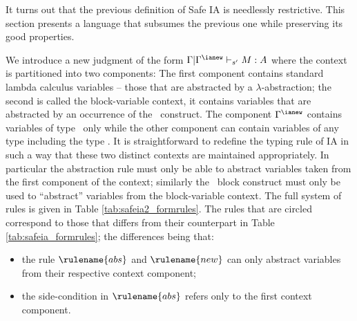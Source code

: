 It turns out that the previous definition of Safe IA is needlessly
restrictive. This section presents a language that subsumes the
previous one while preserving its good properties.

We introduce a new judgment of the form $\Gamma | \Gamma^{\ianew}
\vdash_{s'} M : A$ where the context is partitioned into two
components: The first component contains standard lambda calculus
variables -- those that are abstracted by a $\lambda$-abstraction;
the second is called the block-variable context, it contains
variables that are abstracted by an occurrence of the \ianew\
construct. The component $\Gamma^{\ianew}$ contains variables of
type \iavar\ only while the other component can contain variables of
any type including the type \iavar. It is straightforward to
redefine the typing rule of IA in such a way that these two distinct
contexts are maintained appropriately. In particular the abstraction
rule must only be able to abstract variables taken from the first
component of the context; similarly the \ianew\ block construct must
only be used to ``abstract'' variables from the block-variable
context. The full system of rules is given in Table
\ref{tab:safeia2_formrules}. The rules that are circled correspond
to those that differs from their counterpart in Table
\ref{tab:safeia_formrules}; the  differences being that:
\begin{itemize}
\item the rule $\rulename{abs}$ and $\rulename{new}$ can only
abstract variables from their respective context component;
\item the side-condition in $\rulename{abs}$ refers only to
the first context component.
\end{itemize}

